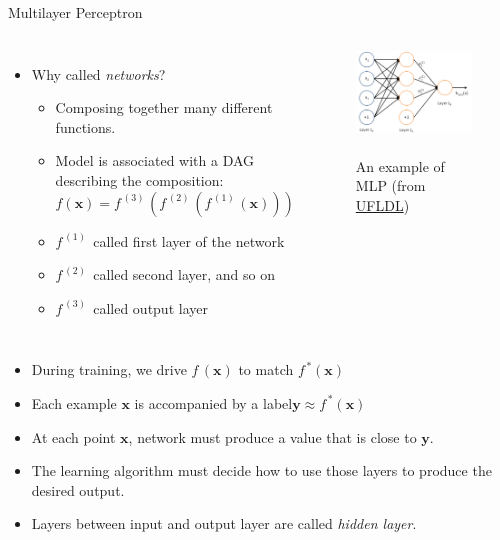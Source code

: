 \documentclass[10pt]{beamer}
\begin{document}
	\begin{frame}{Multilayer Perceptron}
		\begin{columns}[T,onlytextwidth]
			\begin{itemize}
				\item Why called \emph{networks}?
				\onslide<3->
				\begin{itemize}
					\item Composing together many different functions.
					\onslide<4->
					\item Model is associated with a DAG describing the composition:
					\begin{equation*}
					f(\bm{x}) = f^{\,(3)\,}(f^{\,(2)\,}(f^{\,(1)\,}(\bm{x})))
					\end{equation*}
					\item $f^{\,(1)\,}$ called first layer of the network
					\item $f^{\,(2)\,}$ called second layer, and so on
					\item $f^{\,(3)\,}$ called output layer
				\end{itemize}
			\end{itemize}
			\begin{figure}
				\includegraphics<2->[width=10em]{figures/multilayer-perceptron.png}
				\caption{\\ An example of MLP  (from \href{http://ufldl.stanford.edu/wiki/index.php/File:Network331.png}{UFLDL})}
			\end{figure}
		\end{columns}
		\begin{itemize}
			\item During training, we drive $f\,(\bm{x})$ to match $f^{\,*}(\bm{x})$
			\onslide<6->
			\item Each example $\bm{x}$ is accompanied by a label$ \bm{y}\approx f^{\,*}(\bm{x})$
			\onslide<7->
			\item At each point $\bm{x}$, network must produce a value that is close to $\bm{y}$.
			\onslide<8->
			\item The learning algorithm must decide how to use those layers to produce the desired output.
			\onslide<9->
			\item Layers between input and output layer are called \emph{hidden layer}.
		\end{itemize}
	\end{frame}
\end{document}
